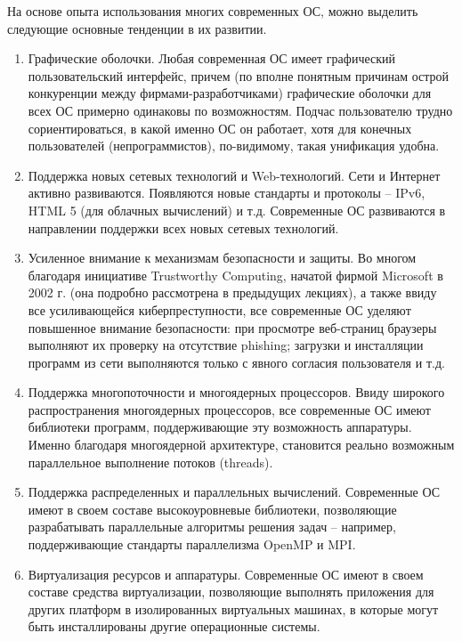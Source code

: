 На основе опыта использования многих современных ОС, можно выделить следующие основные тенденции в их развитии.
\begin{enumerate}
	
	\item Графические оболочки. Любая современная ОС имеет графический пользовательский интерфейс, причем (по вполне понятным причинам острой конкуренции между фирмами-разработчиками) графические оболочки для всех ОС примерно одинаковы по возможностям. Подчас пользователю трудно сориентироваться, в какой именно ОС он работает, хотя для конечных пользователей (непрограммистов), по-видимому, такая унификация удобна.
	
	\item Поддержка новых сетевых технологий и Web-технологий. Сети и Интернет активно развиваются. Появляются новые стандарты и протоколы – IPv6, HTML 5 (для облачных вычислений) и т.д. Современные ОС развиваются в направлении поддержки всех новых сетевых технологий.
	
	\item Усиленное внимание к механизмам безопасности и защиты. Во многом благодаря инициативе Trustworthy Computing, начатой фирмой Microsoft в 2002 г. (она подробно рассмотрена в предыдущих лекциях), а также ввиду все усиливающейся киберпреступности, все современные ОС уделяют повышенное внимание безопасности: при просмотре веб-страниц браузеры выполняют их проверку на отсутствие phishing; загрузки и инсталляции программ из сети выполняются только с явного согласия пользователя и т.д.
	
	\item Поддержка многопоточности и многоядерных процессоров. Ввиду широкого распространения многоядерных процессоров, все современные ОС имеют библиотеки программ, поддерживающие эту возможность аппаратуры. Именно благодаря многоядерной архитектуре, становится реально возможным параллельное выполнение потоков (threads).
	
	\item Поддержка распределенных и параллельных вычислений. Современные ОС имеют в своем составе высокоуровневые библиотеки, позволяющие разрабатывать параллельные алгоритмы решения задач – например, поддерживающие стандарты параллелизма OpenMP и MPI.
	
	\item Виртуализация ресурсов и аппаратуры. Современные ОС имеют в своем составе средства виртуализации, позволяющие выполнять приложения для других платформ в изолированных виртуальных машинах, в которые могут быть инсталлированы другие операционные системы.
	

\end{enumerate}
